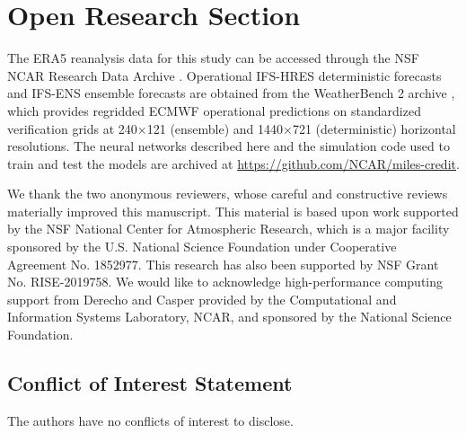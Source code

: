 \documentclass{agujournal2019}
\begin{document}


\section*{Open Research Section}
The ERA5 reanalysis data for this study can be accessed through the NSF NCAR Research Data Archive \cite{hersbach2020era5}. Operational IFS-HRES deterministic forecasts and IFS-ENS ensemble forecasts are obtained from the WeatherBench 2 archive \cite{rasp2023weatherbench2}, which provides regridded ECMWF operational predictions on standardized verification grids at 240×121 (ensemble) and 1440×721 (deterministic) horizontal resolutions. The neural networks described here and the simulation code used to train and test the models are archived at \url{https://github.com/NCAR/miles-credit}. 

\acknowledgments
We thank the two anonymous reviewers, whose careful and constructive reviews materially improved this manuscript. This material is based upon work supported by the NSF National Center for Atmospheric Research, which is a major facility sponsored by the U.S. National Science Foundation under Cooperative Agreement No. 1852977. This research has also been supported by NSF Grant No. RISE-2019758. We would like to acknowledge high-performance computing support from Derecho and Casper \cite{Cheyenne} provided by the Computational and Information Systems Laboratory, NCAR, and sponsored by the National Science Foundation. 

\subsection*{Conflict of Interest Statement}
The authors have no conflicts of interest to disclose.


\end{document}
